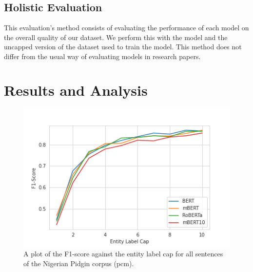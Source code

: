 \documentclass{article}
\begin{document}
\subsection{Holistic Evaluation}
This evaluation's method consists of evaluating the performance of each model on the overall quality of our dataset. We perform this with the model and the uncapped version of the dataset used to train the model. This method does not differ from the usual way of evaluating models in research papers.




\section{Results and Analysis}
\label{sec:res}

\begin{figure}
    \centering
    \includegraphics[width=\columnwidth]{images/pcm_models_plot.png}
    \caption{A plot of the F1-score against the entity label cap for all sentences of the Nigerian Pidgin corpus (pcm).}
    \label{fig:pcm_plot}
\end{figure}
\end{document}
